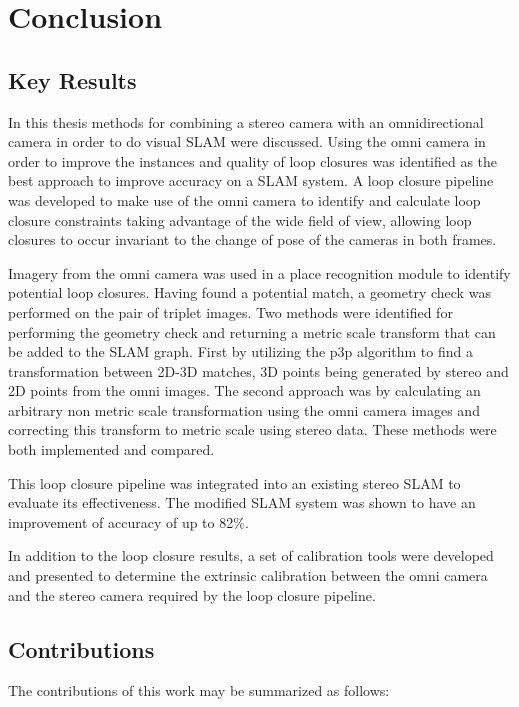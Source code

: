 \chapter{Conclusion}
\label{chapter:conclusion}

\section{Key Results}

In this thesis methods for combining a stereo camera with an omnidirectional camera in order to do visual SLAM were discussed.  Using the omni camera in order to improve the instances and quality of loop closures was identified as the best approach to improve accuracy on a SLAM system.  A loop closure pipeline was developed to make use of the omni camera to identify and calculate loop closure constraints taking advantage of the wide field of view, allowing loop closures to occur invariant to the change of pose of the cameras in both frames.

Imagery from the omni camera was used in a place recognition module to identify potential loop closures.  Having found a potential match, a geometry check was performed on the pair of triplet images.  Two methods were identified for performing the geometry check and returning a metric scale transform that can be added to the SLAM graph. First by utilizing the p3p algorithm to find a transformation between 2D-3D matches, 3D points being generated by stereo and 2D points from the omni images.  The second approach was by calculating an arbitrary non metric scale transformation using the omni camera images and correcting this transform to metric scale using stereo data.  These methods were both implemented and compared.

This loop closure pipeline was integrated into an existing stereo SLAM to evaluate its effectiveness. The modified SLAM system was shown to have an improvement of accuracy of up to 82\%.

In addition to the loop closure results, a set of calibration tools were developed and presented to determine the extrinsic calibration between the omni camera and the stereo camera required by the loop closure pipeline.

\section{Contributions}

The contributions of this work may be summarized as follows:

